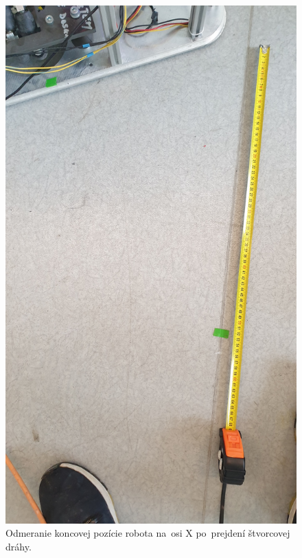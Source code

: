 \begin{figure}[!htbp]
	\begin{center}
		\includegraphics[width=\textwidth]{img/robot_stop_measured_X.jpg}
	\end{center}
	\caption{Odmeranie koncovej pozície robota na~osi X po~prejdení štvorcovej dráhy.}
	\label{fig:stvorec_meranie_X}
\end{figure}

